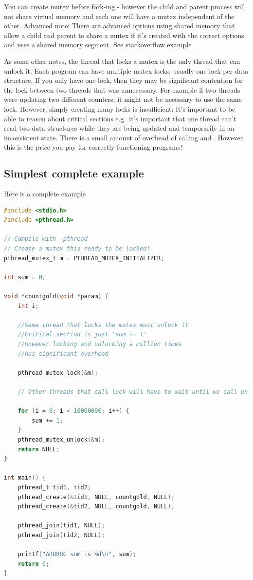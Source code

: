 You can create mutex before fork-ing - however the child and parent process will not share virtual memory and each one will have a mutex independent of the other.
Advanced note: There are advanced options using shared memory that allow a child and parent to share a mutex if it's created with the correct options and uses a shared memory segment.
See \href{http://stackoverflow.com/questions/19172541/procs-fork-and-mutexes}{stackoverflow example}

As some other notes, the thread that locks a mutex is the only thread that can unlock it.
Each program can have multiple mutex locks, usually one lock per data structure.
If you only have one lock, then they may be significant contention for the lock between two threads that was unnecessary.
For example if two threads were updating two different counters, it might not be necessary to use the same lock.
However, simply creating many locks is insufficient: It's important to be able to reason about critical sections e.g.~it's important that one thread can't read two data structures while they are being updated and temporarily in an inconsistent state.
There is a small amount of overhead of calling  and .
However, this is the price you pay for correctly functioning programs!

\subsection{Simplest complete example}

Here is a complete example

\begin{lstlisting}[language=C]
#include <stdio.h>
#include <pthread.h>

// Compile with -pthread
// Create a mutex this ready to be locked!
pthread_mutex_t m = PTHREAD_MUTEX_INITIALIZER;

int sum = 0;

void *countgold(void *param) {
    int i;
    
    //Same thread that locks the mutex must unlock it
    //Critical section is just 'sum += 1'
    //However locking and unlocking a million times
    //has significant overhead
    
    pthread_mutex_lock(&m);

    // Other threads that call lock will have to wait until we call unlock

    for (i = 0; i < 10000000; i++) {
        sum += 1;
    }
    pthread_mutex_unlock(&m);
    return NULL;
}

int main() {
    pthread_t tid1, tid2;
    pthread_create(&tid1, NULL, countgold, NULL);
    pthread_create(&tid2, NULL, countgold, NULL);

    pthread_join(tid1, NULL);
    pthread_join(tid2, NULL);

    printf("ARRRRG sum is %d\n", sum);
    return 0;
}
\end{lstlisting}

